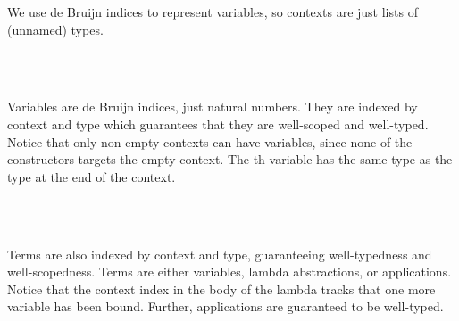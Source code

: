 \documentclass[preliminary,copyright,creativecommons]{eptcs}
\newenvironment{code}{\verbatim}{\endverbatim}
\begin{document}
\noindent
We use de Bruijn indices to
represent variables, so contexts  are just lists of (unnamed) types.

\begin{code}\>  \<[10]\>[10]\AgdaSymbol{:}  \<\\
\>[0]\<[2]\>[2] \<[10]\>[10]\AgdaSymbol{:} \<\\
\>[0]\<[2]\>[2]\AgdaInductiveConstructor{\_,\_} \<[10]\>[10]\AgdaSymbol{:} \AgdaSymbol{(} \AgdaSymbol{:} \AgdaSymbol{)} \AgdaSymbol{(} \AgdaSymbol{:} \AgdaSymbol{)}  \<[34]\>[34]\<\end{code}

\noindent
Variables are de Bruijn indices, just natural numbers. They are
indexed by context and type which guarantees that they are well-scoped
and well-typed. Notice that only non-empty contexts can have variables,
since none of the constructors targets the empty context. The th
variable has the same type as the type at the end of the context.

\begin{code}\>  \AgdaSymbol{:} \AgdaSymbol{(} \AgdaSymbol{:} \AgdaSymbol{)} \AgdaSymbol{(} \AgdaSymbol{:} \AgdaSymbol{)}   \<\\
\>[0]\<[2]\>[2] \<[8]\>[8]\AgdaSymbol{:}  \AgdaSymbol{\}} \<[34]\>[34]  \AgdaSymbol{(} \AgdaInductiveConstructor{,} \AgdaSymbol{)} \<\\
\>[0]\<[2]\>[2] \<[8]\>[8]\AgdaSymbol{:}   \AgdaSymbol{\}} \AgdaSymbol{(} \AgdaSymbol{:}   \AgdaSymbol{)} \<[34]\>[34]  \AgdaSymbol{(} \AgdaInductiveConstructor{,} \AgdaSymbol{)} \<\end{code}

\noindent
Terms are also indexed by context and type, guaranteeing
well-typedness and well-scopedness. Terms are either variables, lambda
abstractions, or applications. Notice that the context index in the
body of the lambda tracks that one more variable has been bound. Further,
applications are guaranteed to be well-typed.
\end{document}
